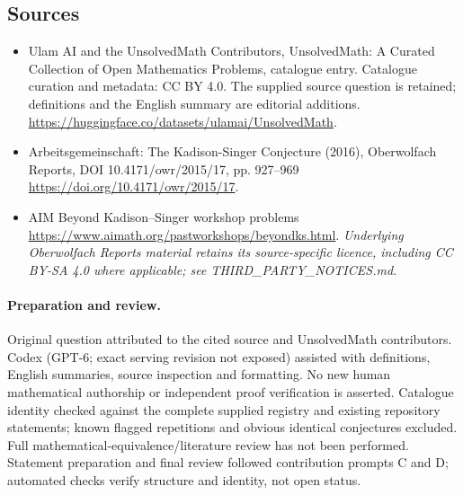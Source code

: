 \documentclass[11pt]{article}
\begin{document}
\subsection{Sources}
\begin{itemize}
\item[\hypertarget{source:statement:1}{S1}] Ulam AI and the UnsolvedMath Contributors, UnsolvedMath: A Curated Collection of Open Mathematics Problems, catalogue entry. Catalogue curation and metadata: CC BY 4.0. The supplied source question is retained; definitions and the English summary are editorial additions.
\url{https://huggingface.co/datasets/ulamai/UnsolvedMath}.
\item[\hypertarget{source:statement:2}{S2}] Arbeitsgemeinschaft: The Kadison-Singer Conjecture (2016), Oberwolfach Reports, DOI 10.4171/owr/2015/17, pp. 927--969
\url{https://doi.org/10.4171/owr/2015/17}.
\item[\hypertarget{source:statement:3}{S3}] AIM Beyond Kadison--Singer workshop problems
\url{https://www.aimath.org/pastworkshops/beyondks.html}.
\textit{Underlying Oberwolfach Reports material retains its source-specific licence, including CC BY-SA 4.0 where applicable; see THIRD\_PARTY\_NOTICES.md.}
\end{itemize}
\paragraph{Preparation and review.}
Original question attributed to the cited source and UnsolvedMath contributors. Codex (GPT-6; exact serving revision not exposed) assisted with definitions, English summaries, source inspection and formatting. No new human mathematical authorship or independent proof verification is asserted. Catalogue identity checked against the complete supplied registry and existing repository statements; known flagged repetitions and obvious identical conjectures excluded. Full mathematical-equivalence/literature review has not been performed. Statement preparation and final review followed contribution prompts C and D; automated checks verify structure and identity, not open status.
\label{end:statement}
\end{document}
